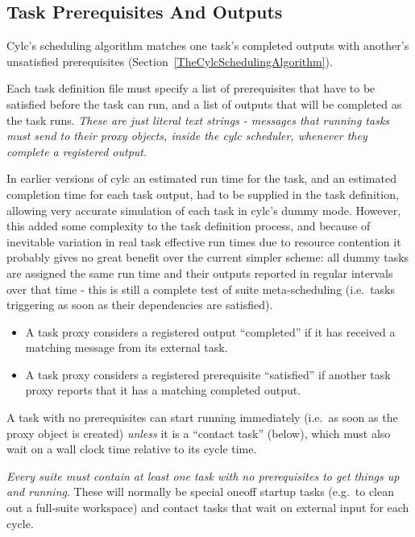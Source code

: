 \documentclass[11pt,a4paper]{article}
\begin{document}
\subsection{Task Prerequisites And Outputs}
\label{TaskPrerequisitesAndOutputs}

Cylc's scheduling algorithm matches one task's completed outputs with
another's unsatisfied prerequisites
(Section~\ref{TheCylcSchedulingAlgorithm}).  

Each task definition file must specify a list of prerequisites that have
to be satisfied before the task can run, and a list of outputs that will
be completed as the task runs. {\em These are just literal text
strings - messages that running tasks must send to their proxy objects,
inside the cylc scheduler, whenever they complete a registered output}.

In earlier versions of cylc an estimated run time for the task, and an
estimated completion time for each task output, had to be supplied in
the task definition, allowing very accurate simulation of each task
in cylc's dummy mode.  However, this added some complexity to the task
definition process, and because of inevitable variation in real task
effective run times due to resource contention it probably gives no
great benefit over the current simpler scheme: all dummy tasks are
assigned the same run time and their outputs reported in regular
intervals over that time - this is still a complete test of suite
meta-scheduling (i.e.\ tasks triggering as soon as their dependencies
are satisfied). 

\begin{itemize}
    \item A task proxy considers a registered output ``completed''
        if it has received a matching message from its external task.

    \item A task proxy considers a registered prerequisite ``satisfied''
        if another task proxy reports that it has a matching completed
        output.

\end{itemize}

A task with no prerequisites can start running immediately (i.e.\ as soon
as the proxy object is created) {\em unless} it is a ``contact task''
(below), which must also wait on a wall clock time relative to its cycle time.

{\em Every suite must contain at least one task with no prerequisites
to get things up and running}. These will normally be special oneoff
startup tasks (e.g.\ to clean out a full-suite workspace) and contact
tasks that wait on external input for each cycle.
\end{document}

